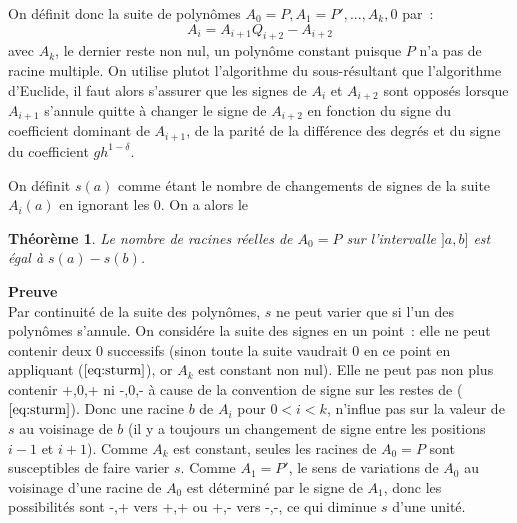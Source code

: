 \documentclass[a4paper,11pt]{article}
\newtheorem{thm}{Théorème}
\begin{document}
\begin{giacjshere}
On d\'efinit donc la suite de polyn\^omes $A_0=P, A_1=P', ..., A_k,0$
par~:
\begin{equation} \label{eq:sturm}
 A_{i} = A_{i+1} Q_{i+2} - A_{i+2} 
\end{equation}
avec $A_k$, le dernier reste non nul, un polyn\^ome constant puisque
$P$ n'a pas de racine multiple. On utilise plutot l'algorithme du 
sous-r\'esultant que l'algorithme d'Euclide, il faut alors
s'assurer que les signes de $A_i$ et $A_{i+2}$ sont oppos\'es lorsque
$A_{i+1} $ s'annule quitte \`a changer le signe de $A_{i+2}$ en fonction
du signe du coefficient dominant de $A_{i+1}$, de la parit\'e de
la diff\'erence des degr\'es et du signe du coefficient $gh^{1-\delta}$.

On d\'efinit $s(a)$ comme \'etant le nombre de changements de signes
de la suite $A_i(a)$ en ignorant les 0.
On a alors le 
\begin{thm}
Le nombre de racines r\'eelles de $A_0=P$ sur l'intervalle
$]a,b]$ est \'egal \`a $s(a)-s(b)$.
\end{thm}

{\bf Preuve}\\
Par continuit\'e de la suite des polyn\^omes, $s$ ne peut varier que
si l'un des polyn\^omes s'annule.
On consid\'ere la suite des signes en un point~: elle ne peut contenir
deux 0 successifs (sinon toute la suite vaudrait 0 en ce point en appliquant
(\(\ref{eq:sturm}\)), or $A_k$ est constant non nul). Elle ne peut pas
non plus contenir +,0,+ ni -,0,- \`a cause de la convention de signe
sur les restes de (\(\ref{eq:sturm}\)). Donc une racine $b$
de $A_i$ pour $ 0 < i < k $, n'influe pas sur la valeur de $s$ au voisinage
de $b$ (il y a toujours un changement de signe entre les positions
$i-1$ et $i+1$). Comme $A_k$ est constant, seules les racines de $A_0=P$
sont susceptibles de faire varier $s$. Comme $A_1=P'$, le sens de
variations de $A_0$ au voisinage d'une racine de $A_0$ est d\'etermin\'e
par le signe de $A_1$, donc les possibilit\'es sont -,+ vers +,+
ou +,- vers -,-, ce qui diminue $s$ d'une unit\'e.



\end{giacjshere}
\end{document}
